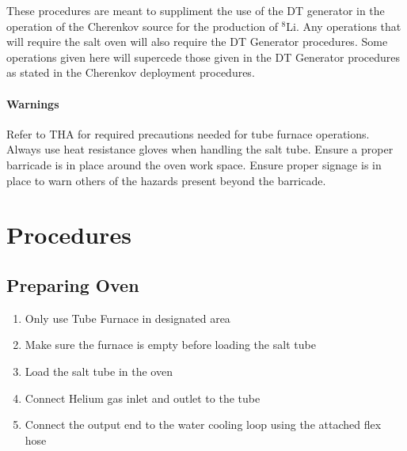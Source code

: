 These procedures are meant to suppliment the use of the DT generator
in the operation of the Cherenkov source for the production of
$^{8}$Li. Any operations that will require the salt oven will also
require the DT Generator procedures. Some operations given here will
supercede those given in the DT Generator procedures as stated in the
Cherenkov deployment procedures. 

\paragraph{Warnings}
\begin{small}
Refer to THA for required precautions needed for tube furnace operations. 
Always use heat resistance gloves when handling the salt tube.
Ensure a proper barricade is in place around the oven work space.
Ensure proper signage is in place to warn others of the hazards present beyond the barricade. 
\end{small}

\section{Procedures}
\subsection{Preparing Oven}
\begin{enumerate}
\item \CheckBox[name=oprep1]{} Only use Tube Furnace in designated area
\item \CheckBox[name=oprep2]{} Make sure the furnace is empty before loading the salt tube
\item \CheckBox[name=oprep3]{} Load the salt tube in the oven
\item \CheckBox[name=oprep4]{} Connect Helium gas inlet and outlet to the tube
\item \CheckBox[name=oprep5]{} Connect the output end to the water cooling loop using the attached flex hose
\end{enumerate}

